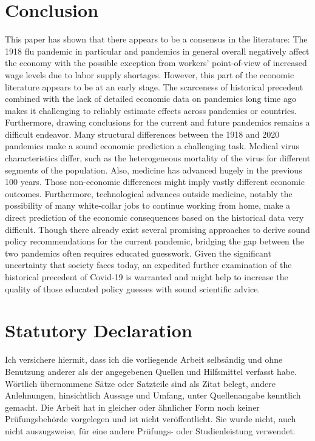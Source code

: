 \documentclass[12pt,a4paper]{article}
\begin{document}
\section{Conclusion}

This paper has shown that there appears to be a consensus in the literature: The 1918 flu pandemic in particular and pandemics in general overall negatively affect the economy with the possible exception from workers' point-of-view of increased wage levels due to labor supply shortages.
However, this part of the economic literature appears to be at an early stage.
The scarceness of historical precedent combined with the lack of detailed economic data on pandemics long time ago makes it challenging to reliably estimate effects across pandemics or countries.
Furthermore, drawing conclusions for the current and future pandemics remains a difficult endeavor.
Many structural differences between the 1918 and 2020 pandemics make a sound economic prediction a challenging task.
Medical virus characteristics differ, such as the heterogeneous mortality of the virus for different segments of the population.
Also, medicine has advanced hugely in the previous 100 years.
Those non-economic differences might imply vastly different economic outcomes.
Furthermore, technological advances outside medicine, notably the possibility of many white-collar jobs to continue working from home, make a direct prediction of the economic consequences based on the historical data very difficult.
Though there already exist several promising approaches to derive sound policy recommendations for the current pandemic, bridging the gap between the two pandemics often requires educated guesswork.
Given the significant uncertainty that society faces today, an expedited further examination of the historical precedent of Covid-19 is warranted and might help to increase the quality of those educated policy guesses with sound scientific advice.


\clearpage
\appendix

\clearpage


\newpage
\thispagestyle{empty}
\section*{Statutory Declaration}

Ich versichere hiermit, dass ich die vorliegende Arbeit selbs\"andig und ohne Benutzung anderer als der angegebenen Quellen und Hilfsmittel verfasst habe. W\"ortlich \"ubernommene S\"atze oder Satzteile sind als Zitat belegt, andere Anlehnungen, hinsichtlich Aussage und Umfang, unter Quellenangabe kenntlich gemacht. Die Arbeit hat in gleicher oder \"ahnlicher Form noch keiner Pr\"ufungsbeh\"orde vorgelegen und ist nicht ver\"offentlicht. Sie wurde nicht, auch nicht auszugsweise, f\"ur eine andere Pr\"ufungs- oder Studienleistung verwendet.
\end{document}
